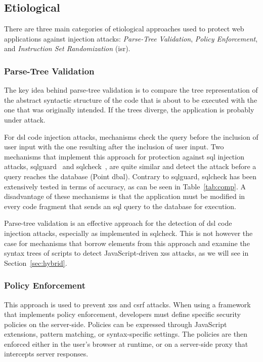 \documentclass[10pt,journal,compsoc]{IEEEtran}
\begin{document}
\subsection{Etiological}
\label{sec:prot}

There are three main categories of etiological approaches used to protect web
applications against injection attacks:
\emph{Parse-Tree Validation},
\emph{Policy Enforcement}, and
\emph{Instruction Set Randomization} ({\sc isr}).

\subsubsection{Parse-Tree Validation}
\label{sec:tree}

The key idea behind parse-tree validation is to compare the tree
representation of the abstract syntactic structure of the code
that is about to be executed with the one that was originally
intended. If the trees diverge, the application is probably under
attack.

For {\sc dsl} code injection attacks, mechanisms check 
the query before the inclusion of user input with the one
resulting after the inclusion of user input.
Two mechanisms that implement this approach for protection
against {\sc sql} injection attacks,
{\sc sqlg}uard~\cite{BWS05} and
{\sc sql}check~\cite{SW06}, are quite similar
and detect the attack before a query reaches the
database (Point {\sc dbal}).
Contrary to {\sc sqlg}uard,
{\sc sql}check has been
extensively tested in terms of accuracy,
as can be seen in Table~\ref{tab:comp}.
A disadvantage of these mechanisms is that the
application must be modified in every code fragment
that sends an {\sc sql} query to the database for execution.

Parse-tree validation is an effective approach
for the detection of {\sc dsl} code injection attacks,
especially as implemented in {\sc sql}check.
This is not however the case
for mechanisms that borrow elements from
this approach and examine the syntax trees
of scripts to detect JavaScript-driven {\sc xss} attacks,
as we will see in Section~\ref{sec:hybrid}.

\subsubsection{Policy Enforcement}
\label{sec:policy}

This approach is used to prevent {\sc xss} and {\sc csrf} attacks. When
using a framework that implements policy enforcement, developers must
define specific security policies on the server-side. Policies can be
expressed through JavaScript extensions, pattern matching, or
syntax-specific settings. The policies are then enforced either in the user's
browser at runtime, or on a server-side proxy that intercepts server
responses.
\end{document}
